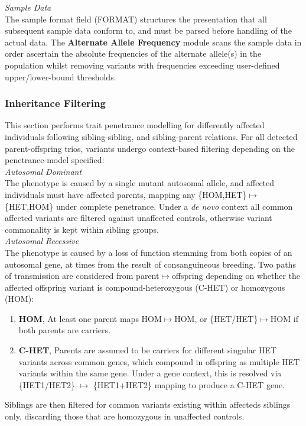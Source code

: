 \documentclass[twocolumn]{bmcart}%
\newcommand{\triplesub}[2]{\noindent\textsl{#1}\\#2\\}  %
\begin{document}
\triplesub{Sample Data}{
The sample format field (FORMAT) structures the presentation that all subsequent sample data conform to, and must be parsed before handling of the actual data. The \textbf{Alternate Allele Frequency} module scans the sample data in order ascertain the absolute frequencies of the alternate allele(s) in the population whilst removing variants with frequencies exceeding user-defined upper/lower-bound thresholds.}


\subsubsection{Inheritance Filtering}

This section performs trait penetrance modelling for differently affected individuals following sibling-sibling, and sibling-parent relations. For all detected parent-offspring trios, variants undergo context-based filtering depending on the penetrance-model specified:\\

\triplesub{Autosomal Dominant}{The phenotype is caused by a single mutant autosomal allele, and affected individuals must have affected parents, mapping any \{HOM,HET\}$\mapsto$\{HET,HOM\} under complete penetrance. Under a \textit{de novo} context all common affected variants are filtered against unaffected controls, otherwise variant commonality is kept within sibling groups.}

\triplesub{Autosomal Recessive}{
The phenotype is caused by a loss of function stemming from both copies of an autosomal gene, at times from the result of consanguineous breeding. Two paths of transmission are considered from parent$\mapsto$offspring depending on whether the affected offspring variant is compound-heterozygous (C-HET) or homozygous (HOM):\\

\begin{enumerate}
	\item{\bf HOM}{, At least one parent maps HOM$\mapsto$HOM, or \{HET/HET\}$\mapsto$HOM if both parents are carriers.}
	\item{\bf C-HET}{, Parents are assumed to be carriers for different singular HET variants across common genes, which compound in offspring as multiple HET variants within the same gene. Under a gene context, this is resolved via \{HET1/HET2\} $\mapsto$ \{HET1+HET2\} mapping to produce a C-HET gene.}
\end{enumerate}


Siblings are then filtered for common variants existing within affecteds siblings only, discarding those that are homozygous in unaffected controls.
}
\end{document}
